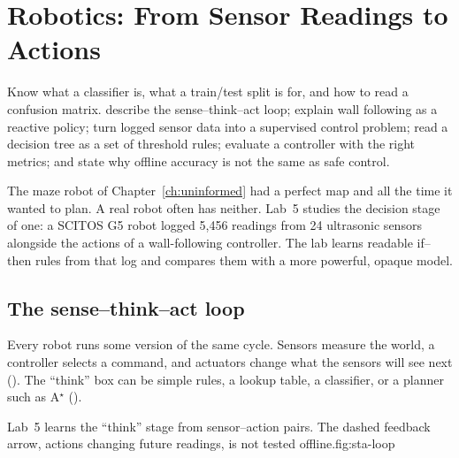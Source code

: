 \chapter{Robotics: From Sensor Readings to Actions}
\label{ch:robotics}

\chapterguide%
  {Know what a classifier is, what a train/test split is for, and how to read a confusion matrix.}
  {describe the sense--think--act loop; explain wall following as a reactive policy; turn logged sensor data into a supervised control problem; read a decision tree as a set of threshold rules; evaluate a controller with the right metrics; and state why offline accuracy is not the same as safe control.}

The maze robot of Chapter~\ref{ch:uninformed} had a perfect map and all the time it wanted to plan. A real robot often has neither. Lab~5 studies the decision stage of one: a SCITOS G5 robot logged 5,456 readings from 24 ultrasonic sensors alongside the actions of a wall-following controller. The lab learns readable if--then rules from that log and compares them with a more powerful, opaque model.

\section{The sense--think--act loop}

Every robot runs some version of the same cycle. Sensors measure the world, a controller selects a command, and actuators change what the sensors will see next (). The ``think'' box can be simple rules, a lookup table, a classifier, or a planner such as A$^\star$ ().

\begin{utpfig}{Lab~5 learns the ``think'' stage from sensor--action pairs. The dashed feedback arrow, actions changing future readings, is not tested offline.}{fig:sta-loop}
\end{utpfig}

